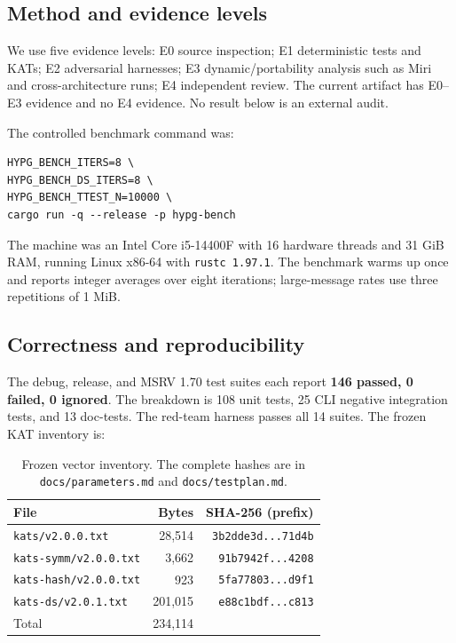 \documentclass[11pt,a4paper]{article}
\theoremstyle{plain}
\theoremstyle{definition}
\theoremstyle{remark}
\begin{document}
\subsection{Method and evidence levels}

We use five evidence levels: E0 source inspection; E1 deterministic
tests and KATs; E2 adversarial harnesses; E3 dynamic/portability
analysis such as Miri and cross-architecture runs; E4 independent
review.  The current artifact has E0--E3 evidence and no E4 evidence.
No result below is an external audit.

The controlled benchmark command was:
\begin{verbatim}
HYPG_BENCH_ITERS=8 \
HYPG_BENCH_DS_ITERS=8 \
HYPG_BENCH_TTEST_N=10000 \
cargo run -q --release -p hypg-bench
\end{verbatim}
The machine was an Intel Core i5-14400F with 16 hardware threads and
31 GiB RAM, running Linux x86-64 with \texttt{rustc 1.97.1}.  The
benchmark warms up once and reports integer averages over eight
iterations; large-message rates use three repetitions of 1 MiB.

\subsection{Correctness and reproducibility}

The debug, release, and MSRV 1.70 test suites each report
\textbf{146 passed, 0 failed, 0 ignored}.  The breakdown is 108 unit
tests, 25 CLI negative integration tests, and 13 doc-tests.  The
red-team harness passes all 14 suites.  The frozen KAT inventory is:

\begin{table}[t]
\centering
\small
\begin{tabular}{@{}lrr@{}}
\toprule
File & Bytes & SHA-256 (prefix) \\
\midrule
\texttt{kats/v2.0.0.txt} & 28,514 & \texttt{3b2dde3d...71d4b} \\
\texttt{kats-symm/v2.0.0.txt} & 3,662 & \texttt{91b7942f...4208} \\
\texttt{kats-hash/v2.0.0.txt} & 923 & \texttt{5fa77803...d9f1} \\
\texttt{kats-ds/v2.0.1.txt} & 201,015 & \texttt{e88c1bdf...c813} \\
\midrule
Total & 234,114 & \\
\bottomrule
\end{tabular}
\caption{Frozen vector inventory.  The complete hashes are in
\texttt{docs/parameters.md} and \texttt{docs/testplan.md}.}
\label{tab:kats}
\end{table}
\end{document}
